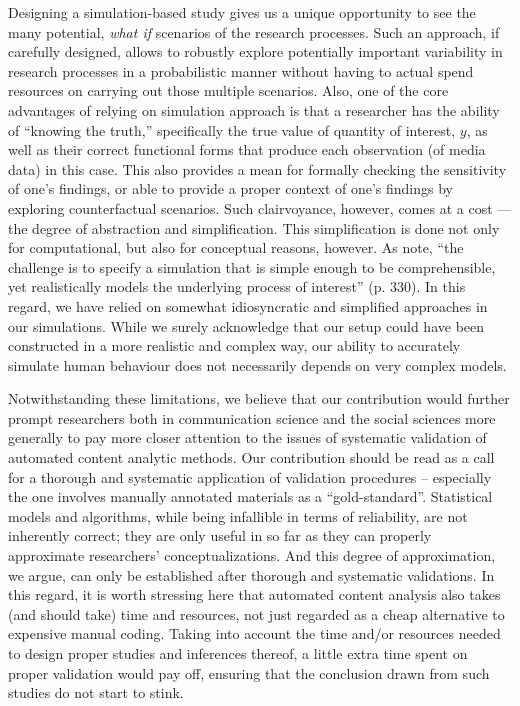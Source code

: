 \documentclass[man, 12pt, a4paper, nolmodern, noextraspace]{apa6}
\begin{document}
    Designing a simulation-based study gives us a unique opportunity to see the many potential, \textit{what if} scenarios of the research processes. Such an approach, if carefully designed, allows to robustly explore potentially important variability in research processes in a probabilistic manner without having to actual spend resources on carrying out those multiple scenarios. Also, one of the core advantages of relying on simulation approach is that a researcher has the ability of \enquote{knowing the truth,} specifically the true value of quantity of interest, $y$, as well as their correct functional forms that produce each observation (of media data) in this case. This also provides a mean for formally checking the sensitivity of one's findings, or able to provide a proper context of one's findings by exploring counterfactual scenarios. Such clairvoyance, however, comes at a cost --- the degree of abstraction and simplification. This simplification is done not only for computational, but also for conceptual reasons, however. As \textcite{scharkow2017measurement} note, \enquote{the challenge is to specify a simulation that is simple enough to be comprehensible, yet realistically models the underlying process of interest} (p. 330). In this regard, we have relied on somewhat idiosyncratic and simplified approaches in our simulations. While we surely acknowledge that our setup could have been constructed in a more realistic and complex way, our ability to accurately simulate human behaviour does not necessarily depends on very complex models. 

    Notwithstanding these limitations, we believe that our contribution would further prompt researchers both in communication science and the social sciences more generally to pay more closer attention to the issues of systematic validation of automated content analytic methods. Our contribution should be read as a call for a thorough and systematic application of validation procedures -- especially the one involves manually annotated materials as a \enquote{gold-standard}. Statistical models and algorithms, while being infallible in terms of reliability, are not inherently correct; they are only useful in so far as they can properly approximate researchers' conceptualizations. And this degree of approximation, we argue, can only be established after thorough and systematic validations. In this regard, it is worth stressing here that automated content analysis also takes (and should take) time and resources, not just regarded as a cheap alternative to expensive manual coding. Taking into account the time and/or resources needed to design proper studies and inferences thereof, a little extra time spent on proper validation would pay off, ensuring that the conclusion drawn from such studies do not start to stink.

    
\printbibliography
\end{document}
